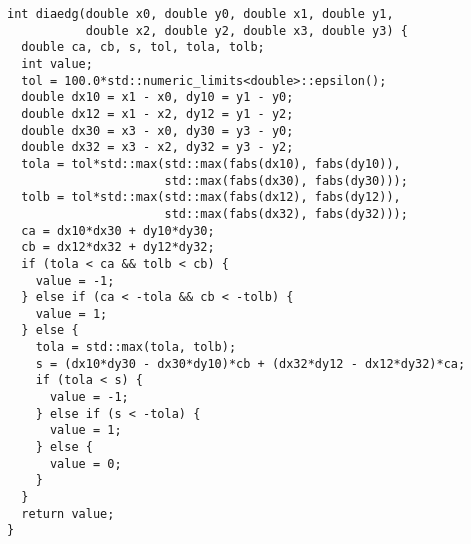 \begin{lstlisting}
int diaedg(double x0, double y0, double x1, double y1,
           double x2, double y2, double x3, double y3) {
  double ca, cb, s, tol, tola, tolb;
  int value;
  tol = 100.0*std::numeric_limits<double>::epsilon();
  double dx10 = x1 - x0, dy10 = y1 - y0;
  double dx12 = x1 - x2, dy12 = y1 - y2;
  double dx30 = x3 - x0, dy30 = y3 - y0;
  double dx32 = x3 - x2, dy32 = y3 - y2;
  tola = tol*std::max(std::max(fabs(dx10), fabs(dy10)),
                      std::max(fabs(dx30), fabs(dy30)));
  tolb = tol*std::max(std::max(fabs(dx12), fabs(dy12)),
                      std::max(fabs(dx32), fabs(dy32)));
  ca = dx10*dx30 + dy10*dy30;
  cb = dx12*dx32 + dy12*dy32;
  if (tola < ca && tolb < cb) {
    value = -1;
  } else if (ca < -tola && cb < -tolb) {
    value = 1;
  } else {
    tola = std::max(tola, tolb);
    s = (dx10*dy30 - dx30*dy10)*cb + (dx32*dy12 - dx12*dy32)*ca;
    if (tola < s) {
      value = -1;
    } else if (s < -tola) {
      value = 1;
    } else {
      value = 0;
    }
  }
  return value;
}


\end{lstlisting}
